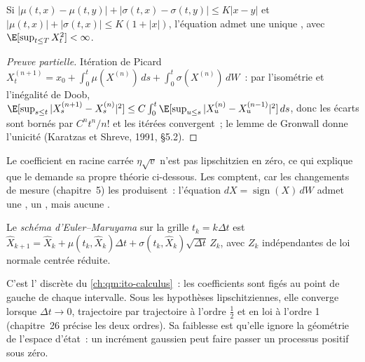 \begin{theorem}\label{thm:qm:stochastic-differential-equations:exist}
Si $|\mu(t,x) - \mu(t,y)| + |\sigma(t,x) - \sigma(t,y)| \le K|x - y|$ et $|\mu(t,x)| + |\sigma(t,x)|
\le K(1 + |x|)$, l'équation admet une unique , avec $\E[\sup_{t\le T}X_t^2] <
\infty$.
\end{theorem}

\begin{proof}[Preuve partielle]
Itération de Picard $X^{(n+1)}_t = x_0 + \int_0^t\mu(X^{(n)})\,ds + \int_0^t\sigma(X^{(n)})\,dW$~: par
l'isométrie et l'inégalité de Doob, $\E[\sup_{s\le t}|X^{(n+1)}_s - X^{(n)}_s|^2] \le C\int_0^t
\E[\sup_{u\le s}|X^{(n)}_u - X^{(n-1)}_u|^2]\,ds$, donc les écarts sont bornés par $C^nt^n/n!$
et les itérées convergent~; le lemme de Gronwall donne l'unicité (Karatzas et Shreve, 1991, §5.2).
\end{proof}

Le coefficient en racine carrée $\eta\sqrt v$ n'est pas lipschitzien en zéro, ce qui explique que le
 demande sa propre théorie ci-dessous. Les  comptent, car les changements de mesure
(chapitre~5) les produisent~: l'équation $dX = \operatorname{sign}(X)\,dW$ admet une , un
, mais aucune .

\begin{definition}\label{def:qm:stochastic-differential-equations:euler}
Le \emph{schéma d'Euler--Maruyama} sur la grille $t_k = k\Delta t$ est
$\hat X_{k+1} = \hat X_k + \mu(t_k, \hat X_k)\Delta t + \sigma(t_k, \hat X_k)\sqrt{\Delta t}\,Z_k$, avec $Z_k$
indépendantes de loi normale centrée réduite.
\end{definition}

C'est l' discrète du \cref{ch:qm:ito-calculus}~: les coefficients sont figés au
point de gauche de chaque intervalle. Sous les hypothèses lipschitziennes, elle converge lorsque $\Delta t \to 0$, trajectoire par trajectoire à l'ordre
$\tfrac12$ et en loi à l'ordre 1 (chapitre~26 précise les deux ordres). Sa faiblesse est
qu'elle ignore la géométrie de l'espace d'état~: un incrément gaussien peut faire passer un processus positif
sous zéro.

